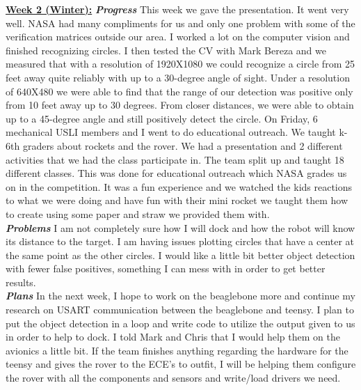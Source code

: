 \documentclass[onecolumn, draftclsnofoot, 10pt, compsoc]{IEEEtran}
\begin{document}
\underline{\textbf{Week 2 (Winter):}}
\newline\textbf{\textit{{Progress}}}
\newline This week we gave the presentation. It went very well. NASA had many compliments for us and only one problem with some of the verification matrices outside our area. I worked a lot on the computer vision and finished recognizing circles. I then tested the CV with Mark Bereza and we measured that with a resolution of 1920X1080 we could recognize a circle from 25 feet away quite reliably with up to a 30-degree angle of sight. Under a resolution of 640X480 we were able to find that the range of our detection was positive only from 10 feet away up to 30 degrees. From closer distances, we were able to obtain up to a 45-degree angle and still positively detect the circle. On Friday, 6 mechanical USLI members and I went to do educational outreach. We taught k-6th graders about rockets and the rover. We had a presentation and 2 different activities that we had the class participate in. The team split up and taught 18 different classes. This was done for educational outreach which NASA grades us on in the competition. It was a fun experience and we watched the kids reactions to what we were doing and have fun with their mini rocket we taught them how to create using some paper and straw we provided them with. \\
\newline\textbf{\textit{{Problems}}}
\newline I am not completely sure how I will dock and how the robot will know its distance to the target. I am having issues plotting circles that have a center at the same point as the other circles. I would like a little bit better object detection with fewer false positives, something I can mess with in order to get better results.\\
\newline\textbf{\textit{{Plans}}}
\newline In the next week, I hope to work on the beaglebone more and continue my research on USART communication between the beaglebone and teensy. I plan to put the object detection in a loop and write code to utilize the output given to us in order to help to dock. I told Mark and Chris that I would help them on the avionics a little bit. If the team finishes anything regarding the hardware for the teensy and gives the rover to the ECE's to outfit, I will be helping them configure the rover with all the components and sensors and write/load drivers we need. \newline
\end{document}

